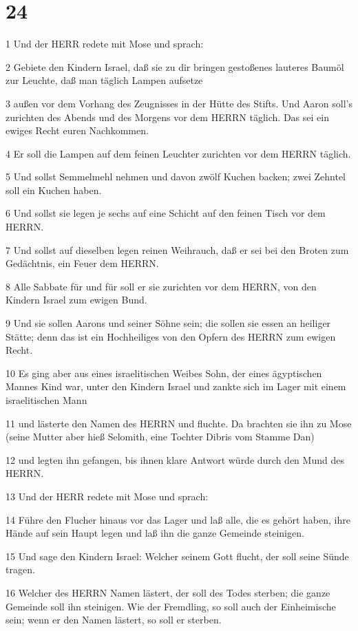 \chapter{24}

\par 1 Und der HERR redete mit Mose und sprach:
\par 2 Gebiete den Kindern Israel, daß sie zu dir bringen gestoßenes lauteres Baumöl zur Leuchte, daß man täglich Lampen aufsetze
\par 3 außen vor dem Vorhang des Zeugnisses in der Hütte des Stifts. Und Aaron soll's zurichten des Abends und des Morgens vor dem HERRN täglich. Das sei ein ewiges Recht euren Nachkommen.
\par 4 Er soll die Lampen auf dem feinen Leuchter zurichten vor dem HERRN täglich.
\par 5 Und sollst Semmelmehl nehmen und davon zwölf Kuchen backen; zwei Zehntel soll ein Kuchen haben.
\par 6 Und sollst sie legen je sechs auf eine Schicht auf den feinen Tisch vor dem HERRN.
\par 7 Und sollst auf dieselben legen reinen Weihrauch, daß er sei bei den Broten zum Gedächtnis, ein Feuer dem HERRN.
\par 8 Alle Sabbate für und für soll er sie zurichten vor dem HERRN, von den Kindern Israel zum ewigen Bund.
\par 9 Und sie sollen Aarons und seiner Söhne sein; die sollen sie essen an heiliger Stätte; denn das ist ein Hochheiliges von den Opfern des HERRN zum ewigen Recht.
\par 10 Es ging aber aus eines israelitischen Weibes Sohn, der eines ägyptischen Mannes Kind war, unter den Kindern Israel und zankte sich im Lager mit einem israelitischen Mann
\par 11 und lästerte den Namen des HERRN und fluchte. Da brachten sie ihn zu Mose (seine Mutter aber hieß Selomith, eine Tochter Dibris vom Stamme Dan)
\par 12 und legten ihn gefangen, bis ihnen klare Antwort würde durch den Mund des HERRN.
\par 13 Und der HERR redete mit Mose und sprach:
\par 14 Führe den Flucher hinaus vor das Lager und laß alle, die es gehört haben, ihre Hände auf sein Haupt legen und laß ihn die ganze Gemeinde steinigen.
\par 15 Und sage den Kindern Israel: Welcher seinem Gott flucht, der soll seine Sünde tragen.
\par 16 Welcher des HERRN Namen lästert, der soll des Todes sterben; die ganze Gemeinde soll ihn steinigen. Wie der Fremdling, so soll auch der Einheimische sein; wenn er den Namen lästert, so soll er sterben.
